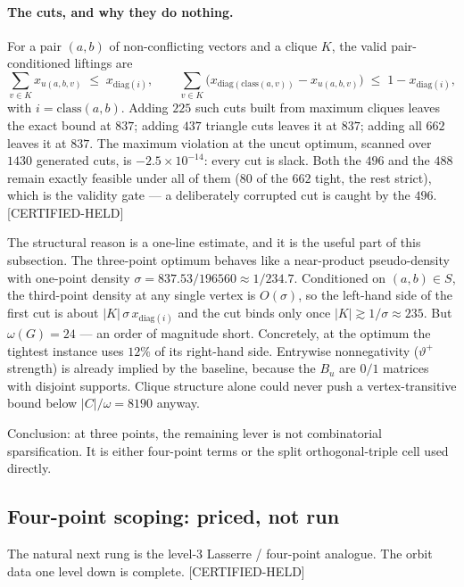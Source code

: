 \documentclass[10pt,a4paper]{article}
\newcommand{\CH}{\textsf{[CERTIFIED-HELD]}}
\begin{document}
\paragraph{The cuts, and why they do nothing.} For a pair $(a,b)$ of non-conflicting vectors and a
clique $K$, the valid pair-conditioned liftings are
\[
  \sum_{v \in K} x_{u(a,b,v)} \;\le\; x_{\mathrm{diag}(i)},
  \qquad
  \sum_{v \in K} \bigl(x_{\mathrm{diag}(\mathrm{class}(a,v))} - x_{u(a,b,v)}\bigr) \;\le\; 1 - x_{\mathrm{diag}(i)},
\]
with $i = \mathrm{class}(a,b)$. Adding $225$ such cuts built from maximum cliques leaves the exact
bound at $837$; adding $437$ triangle cuts leaves it at $837$; adding all $662$ leaves it at $837$.
The maximum violation at the uncut optimum, scanned over $1430$ generated cuts, is
$-2.5\times 10^{-14}$: every cut is slack. Both the $496$ and the $488$ remain exactly feasible under
all of them ($80$ of the $662$ tight, the rest strict), which is the validity gate --- a deliberately
corrupted cut is caught by the $496$. \CH{}

The structural reason is a one-line estimate, and it is the useful part of this subsection. The
three-point optimum behaves like a near-product pseudo-density with one-point density
$\sigma = 837.53/196560 \approx 1/234.7$. Conditioned on $(a,b) \in S$, the third-point density at
any single vertex is $O(\sigma)$, so the left-hand side of the first cut is about
$|K|\,\sigma\, x_{\mathrm{diag}(i)}$ and the cut binds only once $|K| \gtrsim 1/\sigma \approx 235$.
But $\omega(G) = 24$ --- an order of magnitude short. Concretely, at the optimum the tightest
instance uses $12\%$ of its right-hand side. Entrywise nonnegativity ($\vartheta^{+}$ strength) is
already implied by the baseline, because the $B_u$ are $0/1$ matrices with disjoint supports.
Clique structure alone could never push a vertex-transitive bound below $|C|/\omega = 8190$ anyway.

Conclusion: at three points, the remaining lever is not combinatorial sparsification. It is either
four-point terms or the split orthogonal-triple cell used directly.

\subsection{Four-point scoping: priced, not run}\label{sec:fourpoint}

The natural next rung is the level-3 Lasserre / four-point analogue. The orbit data one level down
is complete. \CH{}
\end{document}
